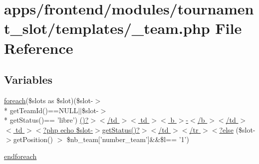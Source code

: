 \hypertarget{frontend_2modules_2tournament__slot_2templates_2__team_8php}{\section{apps/frontend/modules/tournament\-\_\-slot/templates/\-\_\-team.php File Reference}
\label{frontend_2modules_2tournament__slot_2templates_2__team_8php}
}
\subsection*{Variables}
\begin{DoxyCompactItemize}
\item 
\hyperlink{presse_2modules_2news_2templates_2index_success_8php_abc56db52b2e9a59bcd5c9e45ac5cb332}{foreach}(\$slots as \$slot)(\$slot-\/$>$\\*
get\-Team\-Id()==N\-U\-L\-L$|$$|$\$slot-\/$>$\\*
get\-Status()== 'libre') \hyperlink{frontend_2modules_2tournament__slot_2templates_2__team_8php_a41db4077e4532600ef87c5ace595e31f}{()?$>$$<$/td $>$$<$ td $>$$<$ b $>$-\/$<$/b $>$$<$/td $>$$<$ td $>$$<$?php echo \$slot-\/$>$get\-Status()?$>$$<$/td $>$$<$/tr $>$$<$?else} (\$slot-\/$>$get\-Position() $>$ \$nb\-\_\-team\mbox{[}'number\-\_\-team'\mbox{]}\&\&\$l== '1')
\item 
\hyperlink{frontend_2modules_2tournament__slot_2templates_2__team_8php_a672d9707ef91db026c210f98cc601123}{endforeach}
\end{DoxyCompactItemize}


